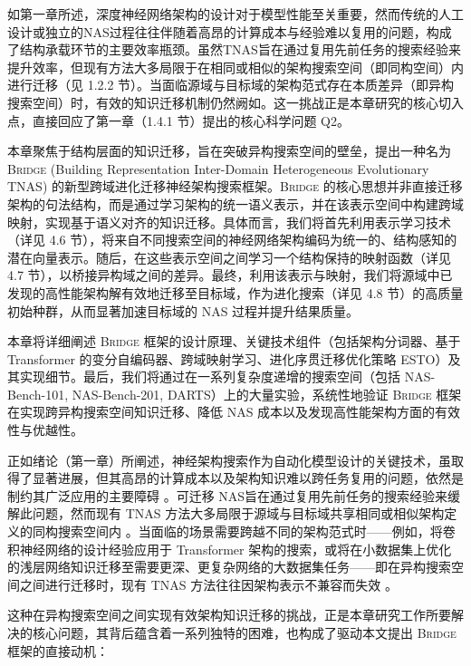 \documentclass[../main.tex]{subfiles}
\begin{document}


如第一章所述，深度神经网络架构的设计对于模型性能至关重要，然而传统的人工设计或独立的NAS过程往往伴随着高昂的计算成本与经验难以复用的问题，构成了结构承载环节的主要效率瓶颈。虽然TNAS旨在通过复用先前任务的搜索经验来提升效率，但现有方法大多局限于在相同或相似的架构搜索空间（即同构空间）内进行迁移（见 1.2.2 节）。当面临源域与目标域的架构范式存在本质差异（即异构搜索空间）时，有效的知识迁移机制仍然阙如。这一挑战正是本章研究的核心切入点，直接回应了第一章（1.4.1 节）提出的核心科学问题 Q2。

本章聚焦于结构层面的知识迁移，旨在突破异构搜索空间的壁垒，提出一种名为 \textsc{Bridge} (Building Representation Inter-Domain Heterogeneous Evolutionary TNAS) 的新型跨域进化迁移神经架构搜索框架。\textsc{Bridge} 的核心思想并非直接迁移架构的句法结构，而是通过学习架构的统一语义表示，并在该表示空间中构建跨域映射，实现基于语义对齐的知识迁移。具体而言，我们将首先利用表示学习技术（详见 4.6 节），将来自不同搜索空间的神经网络架构编码为统一的、结构感知的潜在向量表示。随后，在这些表示空间之间学习一个结构保持的映射函数（详见 4.7 节），以桥接异构域之间的差异。最终，利用该表示与映射，我们将源域中已发现的高性能架构解有效地迁移至目标域，作为进化搜索（详见 4.8 节）的高质量初始种群，从而显著加速目标域的 NAS 过程并提升结果质量。

本章将详细阐述 \textsc{Bridge} 框架的设计原理、关键技术组件（包括架构分词器、基于 Transformer 的变分自编码器、跨域映射学习、进化序贯迁移优化策略 ESTO）及其实现细节。最后，我们将通过在一系列复杂度递增的搜索空间（包括 NAS-Bench-101, NAS-Bench-201, DARTS）上的大量实验，系统性地验证 \textsc{Bridge} 框架在实现跨异构搜索空间知识迁移、降低 NAS 成本以及发现高性能架构方面的有效性与优越性。


正如绪论（第一章）所阐述，神经架构搜索作为自动化模型设计的关键技术，虽取得了显著进展，但其高昂的计算成本以及架构知识难以跨任务复用的问题，依然是制约其广泛应用的主要障碍 。可迁移 NAS旨在通过复用先前任务的搜索经验来缓解此问题，然而现有 TNAS 方法大多局限于源域与目标域共享相同或相似架构定义的同构搜索空间内 。当面临的场景需要跨越不同的架构范式时——例如，将卷积神经网络的设计经验应用于 Transformer 架构的搜索，或将在小数据集上优化的浅层网络知识迁移至需要更深、更复杂网络的大数据集任务——即在异构搜索空间之间进行迁移时，现有 TNAS 方法往往因架构表示不兼容而失效 。

这种在异构搜索空间之间实现有效架构知识迁移的挑战，正是本章研究工作所要解决的核心问题，其背后蕴含着一系列独特的困难，也构成了驱动本文提出 \textsc{Bridge} 框架的直接动机：
\end{document}
